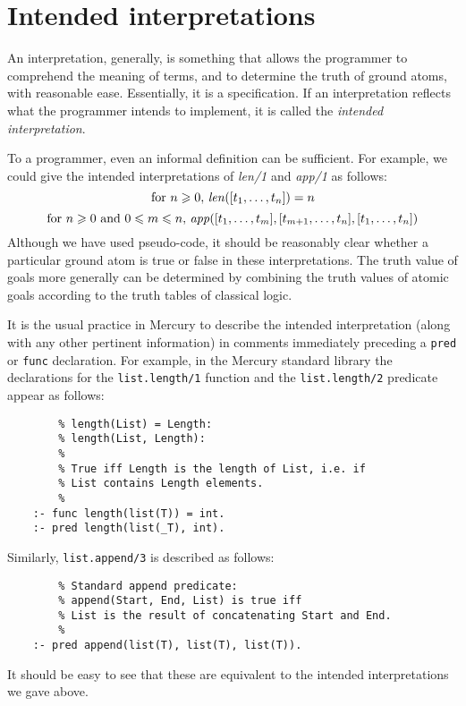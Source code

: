 \section{Intended interpretations}
\label{sec:intended-interp}

An interpretation\label{gi:interpretation}, generally,
is something that allows the programmer
to comprehend the meaning of terms,
and to determine the truth of ground atoms,
with reasonable ease.
Essentially, it is a specification.
If an interpretation reflects what the programmer intends to implement,
it is called the
\emph{intended interpretation\label{gi:intended-interpretation}}.

To a programmer, even an informal definition can be sufficient.
For example, we could give the intended interpretations
of \textit{len/1} and \textit{app/1} as follows:
\[
\text{for } n \geqslant 0, \,\text{\textit{len}}([t_1, \ldots, t_n]) = n
\]
\[
\text{for } n \geqslant 0 \text{ and } 0 \leqslant m \leqslant n,
\,\text{\textit{app}}([t_1, \ldots, t_m], [t_{m+1}, \ldots, t_n], [t_1, \ldots, t_n])
\]
Although we have used pseudo-code,
it should be reasonably clear whether a particular ground atom
is true or false in these interpretations.
The truth value of goals more generally
can be determined by combining the truth values of atomic goals
according to the truth tables of classical logic.

It is the usual practice in Mercury
to describe the intended interpretation
(along with any other pertinent information)
in comments immediately preceding
a \texttt{pred} or \texttt{func} declaration.
For example,
in the Mercury standard library
the declarations for the \texttt{list.length/1} function
and the \texttt{list.length/2} predicate
appear as follows:
\begin{verbatim}
        % length(List) = Length:
        % length(List, Length):
        %
        % True iff Length is the length of List, i.e. if
        % List contains Length elements.
        %
    :- func length(list(T)) = int.
    :- pred length(list(_T), int).
\end{verbatim}
Similarly, \texttt{list.append/3} is described as follows:
\begin{verbatim}
        % Standard append predicate:
        % append(Start, End, List) is true iff
        % List is the result of concatenating Start and End.
        %
    :- pred append(list(T), list(T), list(T)).
\end{verbatim}
It should be easy to see that
these are equivalent to the intended interpretations we gave above.

